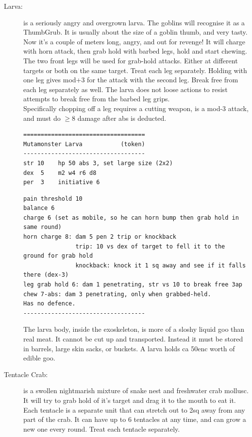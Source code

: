 \begin{description}
\item[Larva:] is a seriously angry and overgrown larva. The goblins will recognise it as a ThumbGrub. It is usually about the size of a goblin thumb, and very tasty. Now it's a couple of meters long, angry, and out for revenge!
It will charge with horn attack, then grab hold with barbed legs, hold and start chewing. The two front legs will be used for grab-hold attacks. Either at different targets or both on the same target. Treat each leg separately. Holding with one leg gives mod+3 for the attack with the second leg. Break free from each leg separately as well. The larva does not loose actions to resist attempts to break free from the barbed leg grips.\\
Specifically chopping off a leg requires a cutting weapon, is a mod-3 attack, and must do $\geq$8 damage after abs is deducted.
\goodbreak \small \begin{samepage} \begin{verbatim}
===================================
Mutamonster Larva           (token)
-----------------------------------
str 10    hp 50 abs 3, set large size (2x2)
dex  5    m2 w4 r6 d8
per  3    initiative 6
\end{verbatim} \end{samepage} \goodbreak \begin{samepage} \begin{verbatim}
pain threshold 10
balance 6
charge 6 (set as mobile, so he can horn bump then grab hold in same round)
horn charge 8: dam 5 pen 2 trip or knockback
               trip: 10 vs dex of target to fell it to the ground for grab hold
               knockback: knock it 1 sq away and see if it falls there (dex-3)
leg grab hold 6: dam 1 penetrating, str vs 10 to break free 3ap
chew 7-abs: dam 3 penetrating, only when grabbed-held.
Has no defence.
-----------------------------------
\end{verbatim} \end{samepage} \normalsize 
The larva body, inside the exoskeleton, is more of a sloshy liquid goo than real meat. It cannot be cut up and transported. Instead it must be stored in barrels, large skin sacks, or buckets. A larva holds ca 50enc worth of edible goo.


\item[Tentacle Crab:] is a swollen nightmarish mixture of snake nest and freshwater crab mollusc. It will try to grab hold of it's target and drag it to the mouth to eat it. Each tentacle is a separate unit that can stretch out to 2sq away from any part of the crab. It can have up to 6 tentacles at any time, and can grow a new one every round. Treat each tentacle separately.


\end{description}

